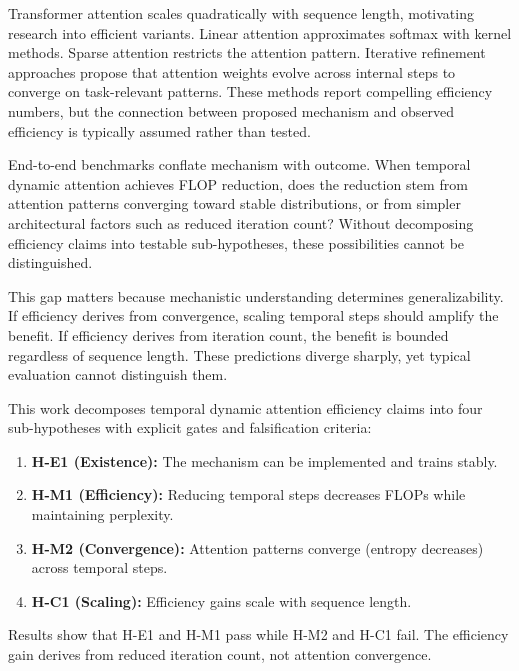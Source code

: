 
Transformer attention scales quadratically with sequence length, motivating research into efficient variants. Linear attention approximates softmax with kernel methods. Sparse attention restricts the attention pattern. Iterative refinement approaches propose that attention weights evolve across internal steps to converge on task-relevant patterns. These methods report compelling efficiency numbers, but the connection between proposed mechanism and observed efficiency is typically assumed rather than tested.

End-to-end benchmarks conflate mechanism with outcome. When temporal dynamic attention achieves FLOP reduction, does the reduction stem from attention patterns converging toward stable distributions, or from simpler architectural factors such as reduced iteration count? Without decomposing efficiency claims into testable sub-hypotheses, these possibilities cannot be distinguished.

This gap matters because mechanistic understanding determines generalizability. If efficiency derives from convergence, scaling temporal steps should amplify the benefit. If efficiency derives from iteration count, the benefit is bounded regardless of sequence length. These predictions diverge sharply, yet typical evaluation cannot distinguish them.

This work decomposes temporal dynamic attention efficiency claims into four sub-hypotheses with explicit gates and falsification criteria:

\begin{enumerate}
\item \textbf{H-E1 (Existence):} The mechanism can be implemented and trains stably.
\item \textbf{H-M1 (Efficiency):} Reducing temporal steps decreases FLOPs while maintaining perplexity.
\item \textbf{H-M2 (Convergence):} Attention patterns converge (entropy decreases) across temporal steps.
\item \textbf{H-C1 (Scaling):} Efficiency gains scale with sequence length.
\end{enumerate}

Results show that H-E1 and H-M1 pass while H-M2 and H-C1 fail. The efficiency gain derives from reduced iteration count, not attention convergence.

